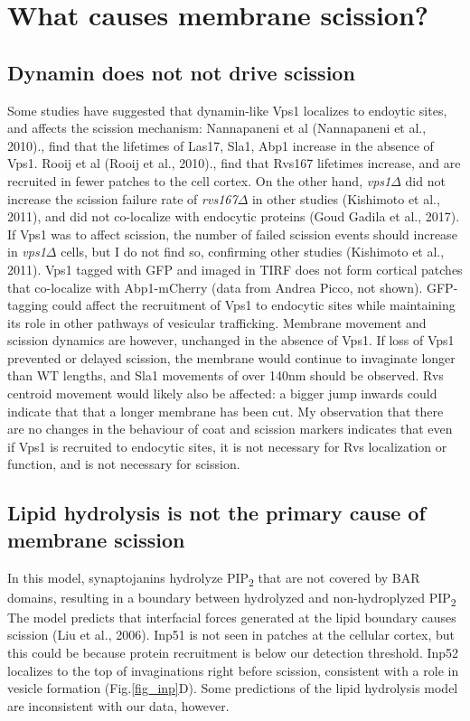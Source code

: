 \section{What causes membrane scission?}


\subsection{Dynamin does not not drive scission}
Some studies have suggested that dynamin-like Vps1 localizes to endoytic sites, and affects the scission mechanism: Nannapaneni et al (Nannapaneni et al., 2010)., find that the lifetimes of Las17, Sla1, Abp1 increase in the absence of Vps1. Rooij et al (Rooij et al., 2010)., find that Rvs167 lifetimes increase, and are recruited in fewer patches to the cell cortex. On the other hand, \textit{vps1$\Delta$} did not increase the scission failure rate of \textit{rvs167$\Delta$} in other studies (Kishimoto et al., 2011), and did not co-localize with endocytic proteins (Goud Gadila et al., 2017). If Vps1 was to affect scission, the number of failed scission events should increase in \textit{vps1$\Delta$} cells, but I do not find so, confirming other studies (Kishimoto et al., 2011). Vps1 tagged with GFP and imaged in TIRF does not form cortical patches that co-localize with Abp1-mCherry (data from Andrea Picco, not shown). GFP-tagging could affect the recruitment of Vps1 to endocytic sites while maintaining its role in other pathways of vesicular trafficking. Membrane movement and scission dynamics are however, unchanged in the absence of Vps1. If loss of Vps1 prevented or delayed scission, the membrane would continue to invaginate longer than WT lengths, and Sla1 movements of over 140nm should be observed. Rvs centroid movement would likely also be affected: a bigger jump inwards could indicate that that a longer membrane has been cut. My observation that there are no changes in the behaviour of coat and scission markers indicates that even if Vps1 is recruited to endocytic sites, it is not necessary for Rvs localization or function, and is not necessary for scission. 



\subsection{Lipid hydrolysis is not the primary cause of membrane scission}
In this model, synaptojanins hydrolyze 	PIP\textsubscript{2} that are not covered by BAR domains, resulting in a boundary between hydrolyzed and non-hydroplyzed 	PIP\textsubscript{2} The model predicts that interfacial forces generated at the lipid boundary causes scission (Liu et al., 2006).  Inp51 is not seen in patches at the cellular cortex, but this could be because protein recruitment is below our detection threshold. Inp52 localizes to the top of invaginations right before scission, consistent with a role in vesicle formation (Fig.\ref{fig_inp}D). Some predictions of the lipid hydrolysis model are inconsistent with our data, however. 


